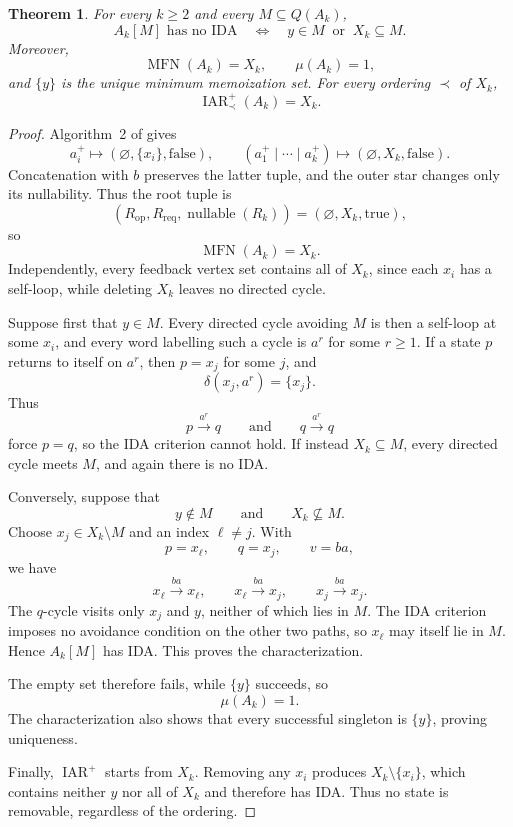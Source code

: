\documentclass[11pt]{amsart}
\newtheorem{theorem}{Theorem}
\newcommand{\MFN}{\operatorname{MFN}}
\newcommand{\IARp}{\operatorname{IAR}^{+}}
\begin{document}
\begin{theorem}
For every $k\ge 2$ and every $M\subseteq Q(A_k)$,
\[
A_k[M]\text{ has no IDA}
\quad\Longleftrightarrow\quad
y\in M\ \text{ or }\ X_k\subseteq M.
\]
Moreover,
\[
\MFN(A_k)=X_k,
\qquad
\mu(A_k)=1,
\]
and $\{y\}$ is the unique minimum memoization set. For every ordering
$\prec$ of $X_k$,
\[
\IARp_{\prec}(A_k)=X_k.
\]
\end{theorem}

\begin{proof}
Algorithm~2 of \cite{BerglundEtAl2026} gives
\[
a_i^+
\longmapsto
(\varnothing,\{x_i\},\mathrm{false}),
\qquad
(a_1^+\mid\cdots\mid a_k^+)
\longmapsto
(\varnothing,X_k,\mathrm{false}).
\]
Concatenation with $b$ preserves the latter tuple, and the outer star
changes only its nullability. Thus the root tuple is
\[
(R_{\mathrm{op}},R_{\mathrm{req}},
  \operatorname{nullable}(R_k))
=
(\varnothing,X_k,\mathrm{true}),
\]
so
\[
\MFN(A_k)=X_k.
\]
Independently, every feedback vertex set contains all of $X_k$, since
each $x_i$ has a self-loop, while deleting $X_k$ leaves no directed
cycle.

Suppose first that $y\in M$. Every directed cycle avoiding $M$ is then
a self-loop at some $x_i$, and every word labelling such a cycle is
$a^r$ for some $r\ge 1$. If a state $p$ returns to itself on $a^r$,
then $p=x_j$ for some $j$, and
\[
\delta(x_j,a^r)=\{x_j\}.
\]
Thus
\[
p\xrightarrow{a^r}q
\qquad\text{and}\qquad
q\xrightarrow{a^r}q
\]
force $p=q$, so the IDA criterion cannot hold. If instead
$X_k\subseteq M$, every directed cycle meets $M$, and again there is
no IDA.

Conversely, suppose that
\[
y\notin M
\qquad\text{and}\qquad
X_k\nsubseteq M.
\]
Choose $x_j\in X_k\setminus M$ and an index $\ell\ne j$. With
\[
p=x_\ell,
\qquad
q=x_j,
\qquad
v=ba,
\]
we have
\[
x_\ell\xrightarrow{ba}x_\ell,
\qquad
x_\ell\xrightarrow{ba}x_j,
\qquad
x_j\xrightarrow{ba}x_j.
\]
The $q$-cycle visits only $x_j$ and $y$, neither of which lies in $M$.
The IDA criterion imposes no avoidance condition on the other two
paths, so $x_\ell$ may itself lie in $M$. Hence $A_k[M]$ has IDA.
This proves the characterization.

The empty set therefore fails, while $\{y\}$ succeeds, so
\[
\mu(A_k)=1.
\]
The characterization also shows that every successful singleton is
$\{y\}$, proving uniqueness.

Finally, $\IARp$ starts from $X_k$. Removing any $x_i$ produces
$X_k\setminus\{x_i\}$, which contains neither $y$ nor all of $X_k$ and
therefore has IDA. Thus no state is removable, regardless of the
ordering.
\end{proof}
\end{document}
